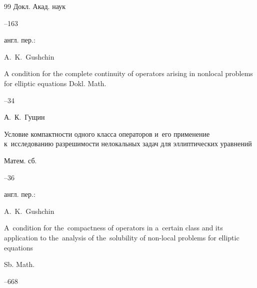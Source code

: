 \begin{thebibliography}{99}
\jour Докл. Акад. наук 




--163

\transl англ. пер.:~

\by A.~K.~Gushchin

\paper 

A condition for the complete continuity of operators arising in nonlocal problems for elliptic equations \jour Dokl. Math.



--34 







\by А.~К.~Гущин

\paper Условие компактности одного класса операторов и~его применение к~исследованию разрешимости нелокальных задач для эллиптических уравнений

\jour Матем. сб.




--36





\transl англ. пер.:~

\by A.~K.~Gushchin

\paper A~condition for the~compactness of operators in a~certain class and its application to the~analysis of the~solubility of non-local problems for elliptic equations

\jour Sb. Math.




--668






\end{thebibliography}
